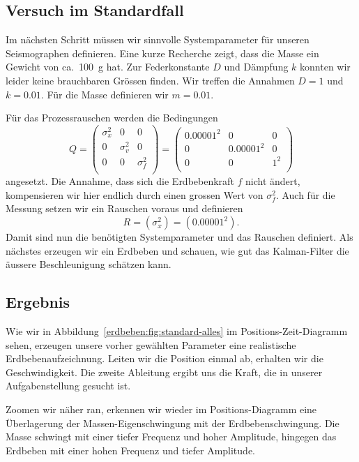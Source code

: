 \subsection{Versuch im Standardfall}
Im nächsten Schritt müssen wir sinnvolle Systemparameter für unseren Seismographen definieren.
Eine kurze Recherche zeigt, dass die Masse ein Gewicht von ca.\ \SI{100}{\gram} hat.
Zur Federkonstante $D$ und Dämpfung $k$ konnten wir leider keine brauchbaren Grössen finden.
Wir treffen die Annahmen $D = 1$ und $k = 0.01$.
Für die Masse definieren wir $m = 0.01$.

Für das Prozessrauschen werden die Bedingungen
\begin{equation}
  Q = 
  \begin{pmatrix}
    \sigma_x ^2 & 0          & 0 \\
    0           & \sigma_v^2 & 0\\
    0           & 0          & \sigma_f^2 \\
  \end{pmatrix}=
  \begin{pmatrix}
    0.00001^2& 0& 0 \\
    0 & 0.00001^2& 0\\
    0 & 0& 1^2 \\
  \end{pmatrix}
\end{equation}
angesetzt.
Die Annahme, dass sich die Erdbebenkraft $f$ nicht ändert,
kompensieren wir hier endlich durch einen grossen Wert von $\sigma_f^2$.
Auch für die Messung setzen wir ein Rauschen voraus und definieren
\begin{equation}
R= (\sigma_x^2)=
(0.00001^2).
\end{equation}
Damit sind nun die benötigten Systemparameter und das Rauschen definiert.
Als nächstes erzeugen wir ein Erdbeben und schauen,
wie gut das Kalman-Filter die äussere Beschleunigung schätzen kann.

\subsection*{Ergebnis}

Wie wir in Abbildung~\ref{erdbeben:fig:standard-alles} im Positions-Zeit-Diagramm sehen, erzeugen unsere vorher gewählten Parameter eine realistische Erdbebenaufzeichnung.
Leiten wir die Position einmal ab, erhalten wir die Geschwindigkeit.
Die zweite Ableitung ergibt uns die Kraft, die in unserer Aufgabenstellung gesucht ist.

Zoomen wir näher ran, erkennen wir wieder im Positions-Diagramm eine Überlagerung der Massen-Eigenschwingung mit der Erdbebenschwingung.
Die Masse schwingt mit einer tiefer Frequenz und hoher Amplitude, hingegen das Erdbeben mit einer hohen Frequenz und tiefer Amplitude.

